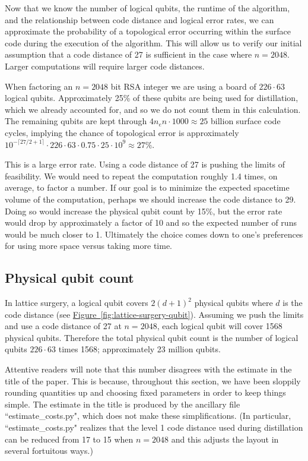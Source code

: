 \documentclass[superscriptaddress,notitlepage,longbibliography]{revtex4-1}
\theoremstyle{definition}
\theoremstyle{definition}
\newcommand{\fig}[1]{\hyperref[fig:#1]{Figure~\ref*{fig:#1}}}
\newcommand{\lenexp}{{n_e}}
\begin{document}
Now that we know the number of logical qubits, the runtime of the algorithm, and the relationship between code distance and logical error rates, we can approximate the probability of a topological error occurring within the surface code during the execution of the algorithm.
This will allow us to verify our initial assumption that a code distance of 27 is sufficient in the case where $n=2048$.
Larger computations will require larger code distances.

When factoring an $n=2048$ bit RSA integer we are using a board of $226 \cdot 63$ logical qubits.
Approximately 25\% of these qubits are being used for distillation, which we already accounted for, and so we do not count them in this calculation.
The remaining qubits are kept through $4 \lenexp n \cdot 1000 \approx 25$ billion surface code cycles, implying the chance of topological error is approximately $10^{-\lceil 27/2+1 \rceil} \cdot 226 \cdot 63 \cdot 0.75 \cdot 25 \cdot 10^9 \approx 27\%$.

This is a large error rate.
Using a code distance of 27 is pushing the limits of feasibility.
We would need to repeat the computation roughly 1.4 times, on average, to factor a number.
If our goal is to minimize the expected spacetime volume of the computation, perhaps we should increase the code distance to 29.
Doing so would increase the physical qubit count by 15\%, but the error rate would drop by approximately a factor of 10 and so the expected number of runs would be much closer to 1.
Ultimately the choice comes down to one's preferences for using more space versus taking more time.


\subsection{Physical qubit count}

In lattice surgery, a logical qubit covers $2(d+1)^2$ physical qubits where $d$ is the code distance (see \fig{lattice-surgery-qubit}).
Assuming we push the limits and use a code distance of 27 at $n=2048$, each logical qubit will cover 1568 physical qubits.
Therefore the total physical qubit count is the number of logical qubits $226 \cdot 63$ times 1568; approximately 23 million qubits.

Attentive readers will note that this number disagrees with the estimate in the title of the paper.
This is because, throughout this section, we have been sloppily rounding quantities up and choosing fixed parameters in order to keep things simple.
The estimate in the title is produced by the ancillary file ``estimate\_costs.py", which does not make these simplifications.
(In particular, ``estimate\_costs.py" realizes that the level 1 code distance used during distillation can be reduced from 17 to 15 when $n=2048$ and this adjusts the layout in several fortuitous ways.)
\end{document}
